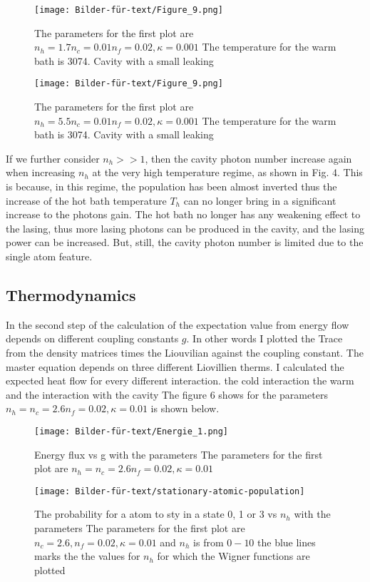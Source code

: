 \documentclass[12pt,a4paper]{article}
\begin{document}
\begin{figure}[hbtp]
\centering
\texttt{[image: Bilder-für-text/Figure\_9.png]}
\caption{The parameters for the first plot are $ n_h=1.7 n_c=0.01 n_f=0.02,\kappa=0.001$ The temperature for the warm bath is 3074. Cavity with a small leaking}
\end{figure}
\begin{figure}[hbtp]
\centering
\texttt{[image: Bilder-für-text/Figure\_9.png]}
\caption{The parameters for the first plot are $ n_h=5.5 n_c=0.01 n_f=0.02,\kappa=0.001$ The temperature for the warm bath is 3074. Cavity with a small leaking}
\end{figure}
If we further consider  $n_h >>1$,
then the cavity photon number increase again when increasing $n_h$ at the very
high temperature regime, as shown in Fig. 4. This is because,
in this regime, the population has been almost inverted
thus the increase of the hot bath temperature $T_h$
can no longer bring in a significant increase to the photons gain.
The hot bath no longer has
any weakening effect to the lasing, thus more lasing photons
can be produced in the cavity, and the lasing power can be
increased. But, still, the cavity photon number is limited due to
the single atom feature.%
\subsection{Thermodynamics}
In the second step of the calculation of the  expectation value from energy flow depends on different coupling constants $g$.
In other words I plotted the Trace from the density matrices times the Liouvilian against the coupling constant.
The master equation depends on three different Liovillien therms. I calculated the expected heat flow for every different interaction. the cold interaction the warm and the interaction with the cavity
The figure 6 shows  for the parameters $n_h=n_c=2.6 n_f=0.02,\kappa=0.01 $ is shown below.

\begin{figure}[hbtp]
\centering
\texttt{[image: Bilder-für-text/Energie\_1.png]}
\caption{Energy flux vs g with the parameters The parameters for the first plot are $ n_h=n_c=2.6 n_f=0.02,\kappa=0.01 $}
\end{figure}



\begin{figure}[hbtp]
\centering
\texttt{[image: Bilder-für-text/stationary-atomic-population]}
\caption{The probability for a atom to sty in a state 0, 1 or 3 vs $n_h$ with the parameters The parameters for the first plot are $n_c=2.6 ,n_f=0.02,\kappa=0.01 $ and $n_h$ is from $0-10$ the blue lines marks the the values for $ n_h$ for which the Wigner functions are plotted }
\end{figure}
\end{document}
